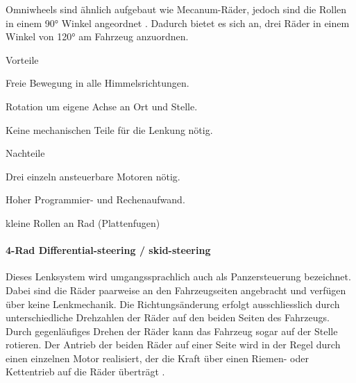 \documentclass[../main.tex]{subfiles}
\begin{document}
Omniwheels sind ähnlich aufgebaut wie Mecanum-Räder, jedoch sind die Rollen in einem 90° Winkel angeordnet \cite{omniwheel}. Dadurch bietet es sich an, drei Räder in einem Winkel von 120° am Fahrzeug anzuordnen.

\begin{minipage}[t]{0.48\textwidth}
    \begin{items}
        \item[Vorteile]
        \item Freie Bewegung in alle Himmelsrichtungen.
      \item Rotation um eigene Achse an Ort und Stelle.
      \item Keine mechanischen Teile für die Lenkung nötig.
    \end{items}
\end{minipage}
\begin{minipage}[t]{0.48\textwidth}
    \begin{items}
      \item [Nachteile]
      \item Drei einzeln ansteuerbare Motoren nötig.
      \item Hoher Programmier- und Rechenaufwand.
      \item kleine Rollen an Rad (Plattenfugen)
    \end{items}
\end{minipage}

\paragraph{4-Rad Differential-steering / skid-steering}
Dieses Lenksystem wird umgangssprachlich auch als Panzersteuerung bezeichnet. Dabei sind die Räder paarweise an den Fahrzeugseiten angebracht und verfügen über keine Lenkmechanik. Die Richtungsänderung erfolgt ausschliesslich durch unterschiedliche Drehzahlen der Räder auf den beiden Seiten des Fahrzeugs. Durch gegenläufiges Drehen der Räder kann das Fahrzeug sogar auf der Stelle rotieren. Der Antrieb der beiden Räder auf einer Seite wird in der Regel durch einen einzelnen Motor realisiert, der die Kraft über einen Riemen- oder Kettentrieb auf die Räder überträgt \cite{skid_steering}.
\end{document}

